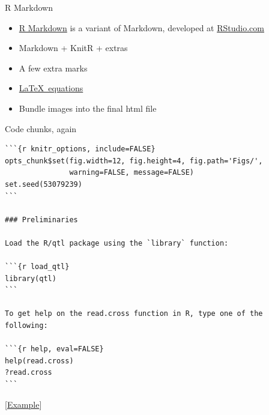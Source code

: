 \documentclass[12pt,t]{beamer}
\newcommand{\lolit}{\color{lolit}}
\newcommand{\bi}{\begin{itemize}}
\newcommand{\ei}{\end{itemize}}
\begin{document}
\begin{frame}[fragile]{R Markdown}

\vspace{24pt}

\bi
\itemsep12pt
\item \href{http://www.rstudio.com/ide/docs/r_markdown}{R Markdown} is a variant of Markdown, developed at
  \href{http://www.rstudio.com}{RStudio.com}
\item Markdown + KnitR + extras
\item A few extra marks
\item \href{http://www.rstudio.com/ide/docs/authoring/using_markdown_equations}{\LaTeX\ equations}
\item Bundle images into the final html file 
\ei

\end{frame}


\begin{frame}[fragile]{Code chunks, again}

\vspace{6pt}

\begin{lstlisting}
```{r knitr_options, include=FALSE}
opts_chunk$set(fig.width=12, fig.height=4, fig.path='Figs/',
               warning=FALSE, message=FALSE)
set.seed(53079239)
```

### Preliminaries

Load the R/qtl package using the `library` function:

```{r load_qtl}
library(qtl)
```

To get help on the read.cross function in R, type one of the
following:

```{r help, eval=FALSE}
help(read.cross)
?read.cross
```
\end{lstlisting}

\vfill

\hfill {\footnotesize \lolit
[\href{https://github.com/kbroman/knitr_knutshell/blob/gh-pages/assets/knitr_example.Rmd}{Example}]}


\end{frame}
\end{document}
